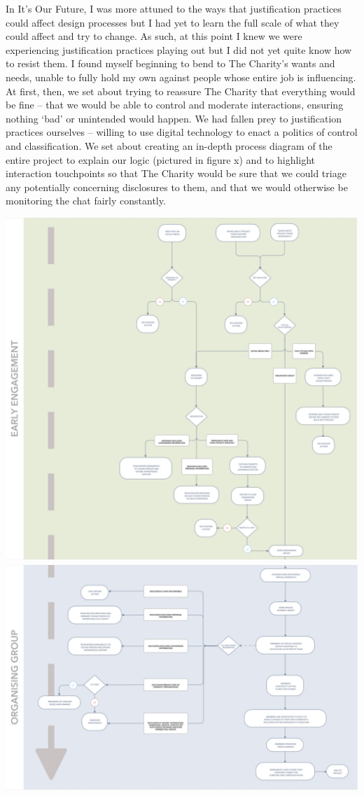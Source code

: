 In It’s Our Future, I was more attuned to the ways that justification practices could affect design processes but I had yet to learn the full scale of what they could affect and try to change. As such, at this point I knew we were experiencing justification practices playing out but I did not yet quite know how to resist them. I found myself beginning to bend to The Charity’s wants and needs, unable to fully hold my own against people whose entire job is influencing. At first, then, we set about trying to reassure The Charity that everything would be fine – that we would be able to control and moderate interactions, ensuring nothing ‘bad’ or unintended would happen. We had fallen prey to justification practices ourselves – willing to use digital technology to enact a politics of control and classification. We set about creating an in-depth process diagram of the entire project to explain our logic (pictured in figure x) and to highlight interaction touchpoints so that The Charity would be sure that we could triage any potentially concerning disclosures to them, and that we would otherwise be monitoring the chat fairly constantly.

\includegraphics[]{Images/7/iof-process-1.png}
\includegraphics[]{Images/7/iof-process-2.png}

